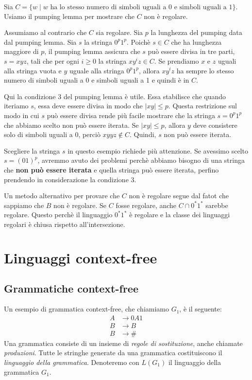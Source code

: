 \documentclass[12pt]{report}
\newcounter{lemma}
\begin{document}
	\begin{example}{}{}
	Sia $C = \{w \mid w \text{ ha lo stesso numero di simboli uguali a 0 e simboli uguali a 1}\}$. Usiamo il pumping lemma per mostrare che $C$ non è regolare.

	Assumiamo al contrario che $C$ sia regolare. Sia $p$ la lunghezza del pumping data dal pumping lemma. Sia $s$ la stringa $0^p1^p$. Poichè $s \in C$ che ha lunghezza maggiore di $p$, il pumping lemma assicura che $s$ può essere divisa in tre parti, $s = xyz$, tali che per ogni $i \geq 0$ la stringa $xy^iz \in C$. Se prendiamo $x$ e $z$ uguali alla stringa vuota e $y$ uguale alla stringa $0^p1^p$, allora $xy^iz$ ha sempre lo stesso numero di simboli uguali a 0 e simboli uguali a 1 e quindi è in $C$.

	Qui la condizione 3 del pumping lemma è utile. Essa stabilisce che quando iteriamo $s$, essa deve essere divisa in modo che $|xy| \leq p$. Questa restrizione sul modo in cui $s$ può essere divisa rende più facile mostrare che la stringa $s = 0^p1^p$ che abbiamo scelto non può essere iterata. Se $|xy| \leq p$, allora $y$ deve consistere solo di simboli uguali a 0, perciò $xyyz \notin C$. Quindi, $s$ non può essere iterata.

	Scegliere la stringa $s$ in questo esempio richiede più attenzione. Se avessimo scelto $s = (01)^p$, avremmo avuto dei problemi perchè abbiamo bisogno di una stringa che \textbf{non può essere iterata} e quella stringa può essere iterata, perfino prendendo in considerazione la condizione 3.

	Un metodo alternativo per provare che $C$ non è regolare segue dal fatot che sappiamo che $B$ non è regolare. Se $C$ fosse regolare, anche $C \cap 0^*1^*$ sarebbe regolare. Questo perchè il linguaggio $0^*1^*$ è regolare e la classe dei linguaggi regolari è chiusa rispetto all'intersezione.
	\end{example}
\chapter{Linguaggi context-free}
\section{Grammatiche context-free}
Un esempio di grammatica context-free, che chiamiamo $G_1$, è il seguente:
\begin{align*}
	A &\to 0A1 \\
	B &\to B \\
	B &\to \#
\end{align*}
Una grammatica consiste di un insieme di \textit{regole di sostituzione}, anche chiamate \textit{produzioni}. Tutte le stringhe generate da una grammatica costituiscono il \textit{linguaggio della grammatica}. Denoteremo con $L(G_1)$ il linguaggio della grammatica $G_1$.
\end{document}
